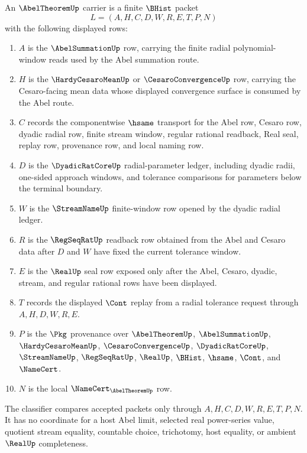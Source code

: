 \begin{definition}
\label{def:abel-theorem-carrier}
An $\AbelTheoremUp$ carrier is a finite $\BHist$ packet
$$
L=(A,H,C,D,W,R,E,T,P,N)
$$
with the following displayed rows:
\begin{enumerate}
\item $A$ is the $\AbelSummationUp$ row, carrying the finite radial polynomial-window reads used by the Abel summation route.
\item $H$ is the $\HardyCesaroMeanUp$ or $\CesaroConvergenceUp$ row, carrying the Cesaro-facing mean data whose displayed convergence surface is consumed by the Abel route.
\item $C$ records the componentwise $\hsame$ transport for the Abel row, Cesaro row, dyadic radial row, finite stream window, regular rational readback, Real seal, replay row, provenance row, and local naming row.
\item $D$ is the $\DyadicRatCoreUp$ radial-parameter ledger, including dyadic radii, one-sided approach windows, and tolerance comparisons for parameters below the terminal boundary.
\item $W$ is the $\StreamNameUp$ finite-window row opened by the dyadic radial ledger.
\item $R$ is the $\RegSeqRatUp$ readback row obtained from the Abel and Cesaro data after $D$ and $W$ have fixed the current tolerance window.
\item $E$ is the $\RealUp$ seal row exposed only after the Abel, Cesaro, dyadic, stream, and regular rational rows have been displayed.
\item $T$ records the displayed $\Cont$ replay from a radial tolerance request through $A,H,D,W,R,E$.
\item $P$ is the $\Pkg$ provenance over $\AbelTheoremUp$, $\AbelSummationUp$, $\HardyCesaroMeanUp$, $\CesaroConvergenceUp$, $\DyadicRatCoreUp$, $\StreamNameUp$, $\RegSeqRatUp$, $\RealUp$, $\BHist$, $\hsame$, $\Cont$, and $\NameCert$.
\item $N$ is the local $\NameCert_{\AbelTheoremUp}$ row.
\end{enumerate}
The classifier compares accepted packets only through $A,H,C,D,W,R,E,T,P,N$. It has no coordinate for a host Abel limit, selected real power-series value, quotient stream equality, countable choice, trichotomy, host equality, or ambient $\RealUp$ completeness.
\end{definition}

